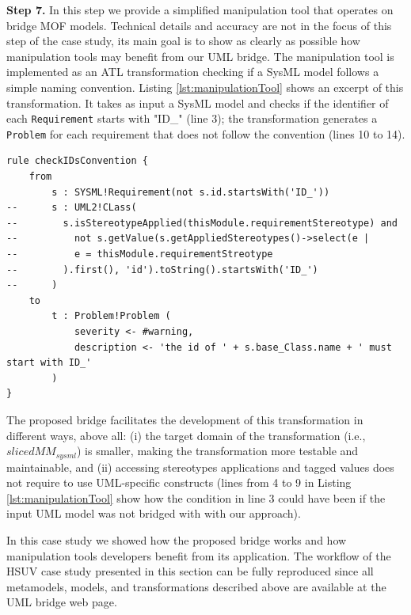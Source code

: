 \textbf{Step 7.} In this step we provide a simplified manipulation tool that operates on bridge MOF models. 
Technical details and accuracy are not in the focus of this step of the case study, 
its main goal is to show as clearly as possible how manipulation tools may benefit from our UML bridge. 
The manipulation tool is implemented as an ATL transformation checking if a SysML model follows a simple naming convention.
Listing \ref{lst:manipulationTool} shows an excerpt of this transformation.
It takes as input a SysML model and checks if the identifier of each \texttt{Requirement} starts with "ID\_" (line 3);
the transformation generates a \texttt{Problem} for each requirement that does not follow the convention (lines 10 to 14).
%
\begin{lstlisting}[breaklines,style=AMMA,language=ATL,mathescape,rulesepcolor=\color{black},caption=ATL transformation manipulating SysML models,captionpos=b,label={lst:manipulationTool}]
rule checkIDsConvention {
	from
		s : SYSML!Requirement(not s.id.startsWith('ID_'))
--		s : UML2!CLass(
--		  s.isStereotypeApplied(thisModule.requirementStereotype) and 
--			not s.getValue(s.getAppliedStereotypes()->select(e |
--			e = thisModule.requirementStreotype
--		  ).first(), 'id').toString().startsWith('ID_')
--		)		
	to
		t : Problem!Problem (
			severity <- #warning,
			description <- 'the id of ' + s.base_Class.name + ' must start with ID_'
		)
}
\end{lstlisting}

The proposed bridge facilitates
the development of this transformation in different ways, above all: 
(i) the target domain of the transformation (i.e., $slicedMM_{sysml}$) is smaller, 
making the transformation more testable and maintainable, and 
(ii) accessing stereotypes applications and tagged values 
does not require to use UML-specific constructs (lines from 4 to 9 in Listing \ref{lst:manipulationTool} 
show how the condition in line 3 could have been if the input UML model was not bridged with with our approach).

In this case study we showed how the proposed bridge works and how manipulation tools developers benefit
from its application. 
The workflow of the HSUV case study presented in this section can be fully reproduced
since all metamodels, models, and transformations described above are available at the UML bridge web page.


